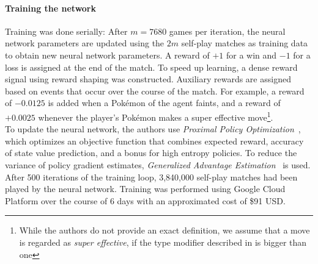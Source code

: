 \paragraph{Training the network}
Training was done serially: After $m = 7680$ games per iteration, the neural network parameters are updated
using the $2m$ self-play matches as training data to obtain new neural network parameters. A reward
of $+1$ for a win and $-1$ for a loss is assigned at the end of the match. To speed up learning, a 
dense reward signal using reward shaping was constructed. Auxiliary rewards are assigned based on
events that occur over the course of the match. For example, a reward of $-0.0125$ is added when a 
Pokémon of the agent faints, and a reward of $+0.0025$ whenever the player's Pokémon makes a 
super effective move\footnote{While the authors do not provide an exact definition, we assume
that a move is regarded as \textit{super effective}, if the type modifier described in 
 is bigger than one}. \\
To update the neural network, the authors use \textit{Proximal Policy Optimization}~\autocite{schulman2017proximal}, which optimizes
an objective function that combines expected reward, accuracy of state value prediction, and a bonus
for high entropy policies. To reduce the variance of policy gradient estimates, \textit{Generalized
Advantage Estimation}~\autocite{schulman2018highdimensional} is used. \\
After 500 iterations of the training loop, 3,840,000 self-play matches had been played by the neural
network. Training was performed using Google Cloud Platform over the course of 6 days with an 
approximated cost of \$91 USD.

